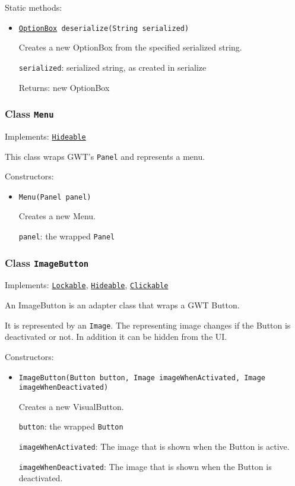 Static methods:
\begin{itemize}
\item \texttt{\hyperref[type:edu.kit.wavelength.client.view.webui.component.OptionBox]{OptionBox} deserialize(String serialized)}

Creates a new OptionBox from the specified serialized string.

\texttt{serialized}: serialized string, as created in serialize

Returns: new OptionBox

\end{itemize}

\subsubsection{Class \texttt{Menu}}
\label{type:edu.kit.wavelength.client.view.webui.component.Menu}
Implements: \texttt{\hyperref[type:edu.kit.wavelength.client.view.api.Hideable]{Hideable}}

This class wraps GWT's \texttt{Panel} and represents a menu.

Constructors:
\begin{itemize}
\item \texttt{Menu(Panel panel)}

Creates a new Menu.

\texttt{panel}: the wrapped \texttt{Panel}

\end{itemize}

\subsubsection{Class \texttt{ImageButton}}
\label{type:edu.kit.wavelength.client.view.webui.component.ImageButton}
Implements: \texttt{\hyperref[type:edu.kit.wavelength.client.view.api.Lockable]{Lockable}}, \texttt{\hyperref[type:edu.kit.wavelength.client.view.api.Hideable]{Hideable}}, \texttt{\hyperref[type:edu.kit.wavelength.client.view.api.Clickable]{Clickable}}

An ImageButton is an adapter class that wraps a GWT Button.

 It is represented by an \texttt{Image}. The representing image changes if the
 Button is deactivated or not. In addition it can be hidden from the UI.

Constructors:
\begin{itemize}
\item \texttt{ImageButton(Button button, Image imageWhenActivated, Image imageWhenDeactivated)}

Creates a new VisualButton.

\texttt{button}: the wrapped \texttt{Button}

\texttt{imageWhenActivated}: The image that is shown when the Button is active.

\texttt{imageWhenDeactivated}: The image that is shown when the Button is deactivated.

\end{itemize}

